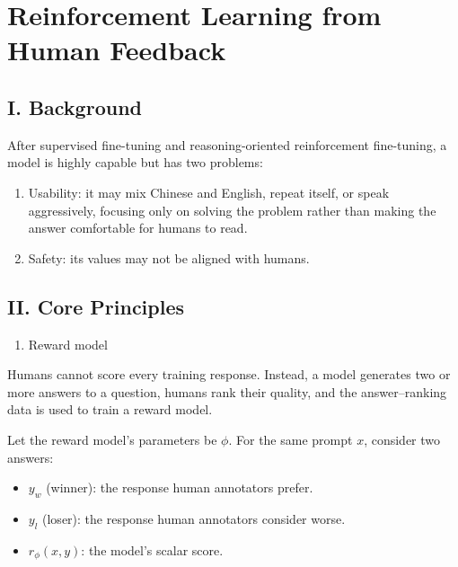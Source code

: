 \setcounter{section}{0}

\hypertarget{reinforcement-learning-from-human-feedback}{%
\section{Reinforcement Learning from Human Feedback}\label{reinforcement-learning-from-human-feedback}}

\hypertarget{i.-background-1}{%
\subsection{I. Background}\label{i.-background-1}}

After supervised fine-tuning and reasoning-oriented reinforcement fine-tuning, a model is highly capable but has two problems:

\begin{enumerate}
\def\labelenumi{\arabic{enumi}.}
\item
  Usability: it may mix Chinese and English, repeat itself, or speak aggressively, focusing only on solving the problem rather than making the answer comfortable for humans to read.
\item
  Safety: its values may not be aligned with humans.
\end{enumerate}

\hypertarget{ii.-core-principles}{%
\subsection{II. Core Principles}\label{ii.-core-principles}}

\begin{enumerate}
\def\labelenumi{\arabic{enumi}.}
\tightlist
\item
  Reward model
\end{enumerate}

Humans cannot score every training response. Instead, a model generates two or more answers to a question, humans rank their quality, and the answer--ranking data is used to train a reward model.

Let the reward model's parameters be \(\phi\). For the same prompt \(x\), consider two answers:

\begin{itemize}
\tightlist
\item
  \(y_w\) (winner): the response human annotators prefer.
\item
  \(y_l\) (loser): the response human annotators consider worse.
\item
  \(r_\phi(x,y)\): the model's scalar score.
\end{itemize}


